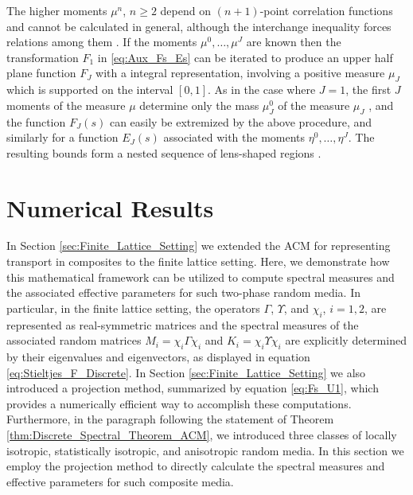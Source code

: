 \documentclass{cmslatex}
\begin{document}
The higher moments $\mu^n$, $n\geq2$ depend on $(n+1)$-point correlation
functions \cite{Golden:CMP-473} and cannot be calculated in general,
although the interchange inequality forces relations among them
\cite{Milton:JAP-5294}. If the moments $\mu^0,\ldots,\mu^J$ are known then the
transformation $F_1$ in \eqref{eq:Aux_Fs_Es} can be iterated to
produce an upper half plane function $F_J$ with a integral
representation, involving a positive measure $\mu_J$ which is supported
on the interval $[0,1]$. As in the case where $J=1$, the first $J$
moments of the measure $\mu$ determine only the mass $\mu_J^0$ of the
measure $\mu_J$ \cite{Golden:JMPS-333}, and the function $F_J(s)$ can
easily be extremized by the above procedure, and similarly for a
function $E_J(s)$ associated with the moments $\eta^0,\ldots,\eta^J$. The
resulting bounds form a nested sequence of lens-shaped regions
\cite{Golden:JMPS-333}.




\section{Numerical Results}\label{sec:Numerical_Results}
%
In Section \ref{sec:Finite_Lattice_Setting} we extended the ACM for
representing transport in composites to the finite lattice
setting. Here, we demonstrate how this mathematical 
framework can be utilized to compute spectral measures and the
associated effective parameters for such two-phase random media. In
particular, in the finite lattice setting, the operators $\Gamma$, $\Upsilon$, and 
$\chi_i$, $i=1,2$, are represented as real-symmetric matrices and the
spectral measures of the associated random matrices $M_i=\chi_i\Gamma\chi_i$ and 
$K_i=\chi_i\Upsilon\chi_i$ are explicitly determined by their eigenvalues and
eigenvectors, as displayed in equation
\eqref{eq:Stieltjes_F_Discrete}. In Section
\ref{sec:Finite_Lattice_Setting} we also introduced a projection method,
summarized by equation \eqref{eq:Fs_U1}, which provides a numerically efficient
way to accomplish these computations. Furthermore, in the paragraph
following the statement of Theorem
\ref{thm:Discrete_Spectral_Theorem_ACM}, we introduced three 
classes of locally isotropic, statistically isotropic, and anisotropic
random media. In this section we employ the projection method to
directly calculate the spectral measures and effective parameters for
such composite media.
\end{document}
